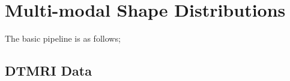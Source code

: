 \documentclass[]{article}
\begin{document}
\newpage

\section{Multi-modal Shape Distributions}

The basic pipeline is as follows;\\


\subsection{DTMRI Data}\label{DTMRI}
\end{document}
